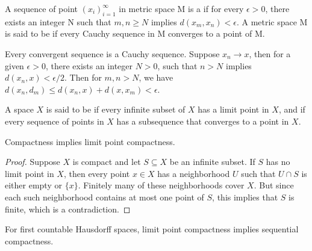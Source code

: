\documentclass[11pt,a4paper]{article}
\begin{document}
\begin{definition}
A sequence of point $(x_i)_{i=1}^\infty$ in metric space M is a  if for every $\epsilon>0$, there exists an integer N such that $m,n\ge N$ implies $d(x_m,x_n)<\epsilon$. A metric space M is said to be  if every Cauchy sequence in M converges to a point of M.
\end{definition}

\begin{remark}
Every convergent sequence is a Cauchy sequence. Suppose $x_n\rightarrow x$, then for a given $\epsilon>0$, there exists an integer $N>0$, such that $n>N$ implies $d(x_n,x)<\epsilon/2$. Then for $m,n>N$, we have $d(x_n,d_m)\le d(x_n,x)+d(x,x_m)<\epsilon$.
\end{remark}

\begin{definition}
A space $X$ is said to be  if every infinite subset of $X$ has a limit point in $X$, and  if every sequence of points in $X$ has a subsequence that converges to a point in $X$.
\end{definition}

\begin{proposition}
Compactness implies limit point compactness.
\end{proposition}

\begin{proof}
Suppose $X$ is compact and let $S\subseteq X$ be an infinite subset. If $S$ has no limit point in $X$, then every point $x\in X$ has a neighborhood $U$ such that $U\cap S$ is either empty or $\{x\}$. Finitely many of these neighborhoods cover $X$. But since each such neighborhood contains at most one point of $S$, this implies that $S$ is finite, which is a contradiction.
\end{proof}

\begin{proposition}
For first countable Hausdorff spaces, limit point compactness implies sequential compactness.
\end{proposition}
\end{document}
